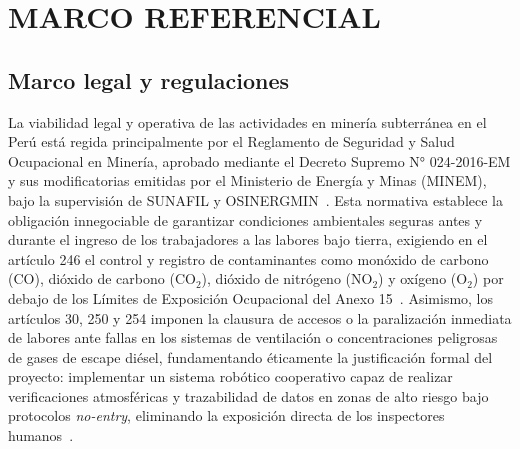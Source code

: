 \chapter{MARCO REFERENCIAL}

\section{Marco legal y regulaciones}
\hspace{1.25cm}
La viabilidad legal y operativa de las actividades en minería subterránea en el Perú está regida principalmente por el Reglamento de Seguridad y Salud Ocupacional en Minería, aprobado mediante el Decreto Supremo N° 024-2016-EM y sus modificatorias emitidas por el Ministerio de Energía y Minas (MINEM), bajo la supervisión de SUNAFIL y OSINERGMIN~\cite{MINEM_DS024_2016,OSINERGMIN_BoletinGSM_2020}. Esta normativa establece la obligación innegociable de garantizar condiciones ambientales seguras antes y durante el ingreso de los trabajadores a las labores bajo tierra, exigiendo en el artículo 246 el control y registro de contaminantes como monóxido de carbono (CO), dióxido de carbono ($\text{CO}_2$), dióxido de nitrógeno ($\text{NO}_2$) y oxígeno ($\text{O}_2$) por debajo de los Límites de Exposición Ocupacional del Anexo 15~\cite{MINEM_DS024_2016}. Asimismo, los artículos 30, 250 y 254 imponen la clausura de accesos o la paralización inmediata de labores ante fallas en los sistemas de ventilación o concentraciones peligrosas de gases de escape diésel, fundamentando éticamente la justificación formal del proyecto: implementar un sistema robótico cooperativo capaz de realizar verificaciones atmosféricas y trazabilidad de datos en zonas de alto riesgo bajo protocolos \textit{no-entry}, eliminando la exposición directa de los inspectores humanos~\cite{MINEM_DS024_2016,OSINERGMIN_BoletinGSM_2020}.

